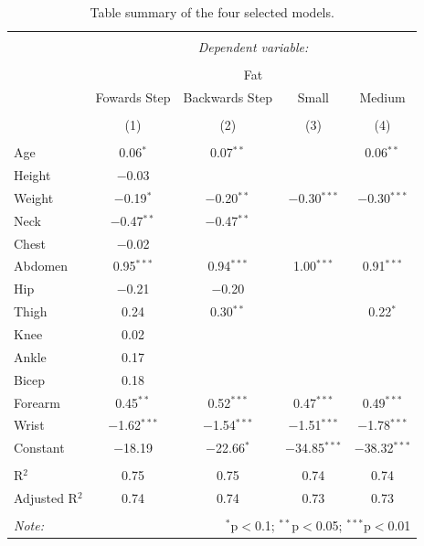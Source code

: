 \documentclass[letterpaper,9pt,twocolumn,twoside,]{pinp}
\begin{document}
\begin{table}[!htbp] \centering 
  \caption{\textnormal{Table summary of the four selected models.}} 
  \label{tab:mod} 
\begin{tabular}{@{\extracolsep{5pt}}lcccc} 
\\[-1.8ex]\hline 
\hline \\[-1.8ex] 
 & \multicolumn{4}{c}{\textit{Dependent variable:}} \\ 
\cline{2-5} 
\\[-1.8ex] & \multicolumn{4}{c}{Fat} \\ 
 & Fowards Step & Backwards Step & Small & Medium \\ 
\\[-1.8ex] & (1) & (2) & (3) & (4)\\ 
\hline \\[-1.8ex] 
 Age & 0.06$^{*}$ & 0.07$^{**}$ &  & 0.06$^{**}$ \\ 
  Height & $-$0.03 &  &  &  \\ 
  Weight & $-$0.19$^{*}$ & $-$0.20$^{**}$ & $-$0.30$^{***}$ & $-$0.30$^{***}$ \\ 
  Neck & $-$0.47$^{**}$ & $-$0.47$^{**}$ &  &  \\ 
  Chest & $-$0.02 &  &  &  \\ 
  Abdomen & 0.95$^{***}$ & 0.94$^{***}$ & 1.00$^{***}$ & 0.91$^{***}$ \\ 
  Hip & $-$0.21 & $-$0.20 &  &  \\ 
  Thigh & 0.24 & 0.30$^{**}$ &  & 0.22$^{*}$ \\ 
  Knee & 0.02 &  &  &  \\ 
  Ankle & 0.17 &  &  &  \\ 
  Bicep & 0.18 &  &  &  \\ 
  Forearm & 0.45$^{**}$ & 0.52$^{***}$ & 0.47$^{***}$ & 0.49$^{***}$ \\ 
  Wrist & $-$1.62$^{***}$ & $-$1.54$^{***}$ & $-$1.51$^{***}$ & $-$1.78$^{***}$ \\ 
  Constant & $-$18.19 & $-$22.66$^{*}$ & $-$34.85$^{***}$ & $-$38.32$^{***}$ \\ 
 \hline \\[-1.8ex] 
R$^{2}$ & 0.75 & 0.75 & 0.74 & 0.74 \\ 
Adjusted R$^{2}$ & 0.74 & 0.74 & 0.73 & 0.73 \\ 
\hline 
\hline \\[-1.8ex] 
\textit{Note:}  & \multicolumn{4}{r}{$^{*}$p$<$0.1; $^{**}$p$<$0.05; $^{***}$p$<$0.01} \\ 
\end{tabular} 
\end{table}
\end{document}
